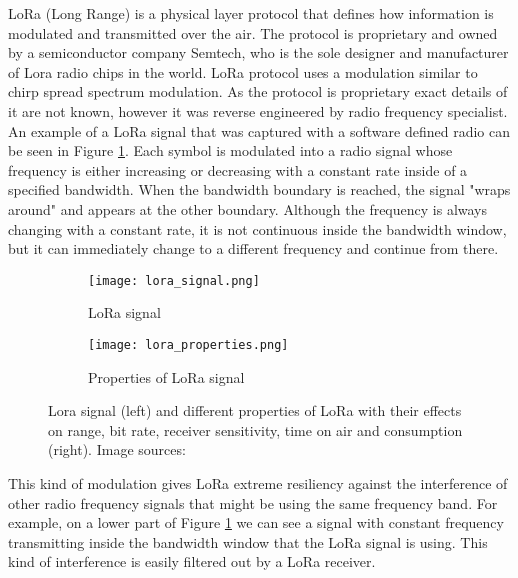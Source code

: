 LoRa (Long Range) is a physical layer protocol that defines how information is modulated and transmitted over the air\cite{lora_article}\cite{lora_nbiot}.
The protocol is proprietary and owned by a semiconductor company Semtech, who is the sole designer and manufacturer of Lora radio chips in the world.
LoRa protocol uses a modulation similar to chirp spread spectrum modulation\cite{lora_article}.
As the protocol is proprietary exact details of it are not known, however it was reverse engineered by radio frequency specialist\cite{lora_github}.
An example of a LoRa signal that was captured with a software defined radio can be seen in Figure \ref{lora1}.
Each symbol is modulated into a radio signal whose frequency is either increasing or decreasing with a constant rate inside of a specified bandwidth.
When the bandwidth boundary is reached, the signal "wraps around" and appears at the other boundary.
Although the frequency is always changing with a constant rate, it is not continuous inside the bandwidth window, but it can immediately change to a different frequency and continue from there.

\begin{figure}[ht]
    \begin{subfigure}{0.3\textwidth}
        \centering
        \texttt{[image: lora\_signal.png]} 
        \caption{ LoRa signal}
        \label{lora1}
    \end{subfigure}
    \hspace{0.5cm}%
    \begin{subfigure}{0.7\textwidth}
        \texttt{[image: lora\_properties.png]}
        \caption{ Properties of LoRa signal}
        \label{lora2}
    \end{subfigure}
\caption[Properties of Lora signal.] {Lora signal (left) and different properties of LoRa with their effects on range, bit rate, receiver sensitivity, time on air and consumption (right). Image sources:\cite{lora_github}\cite{lora_philly}}
    \label{lora}
\end{figure}

This kind of modulation gives LoRa extreme resiliency against the interference of other radio frequency signals that might be using the same frequency band\cite{lora_article}\cite{lora_philly}.
For example, on a lower part of Figure \ref{lora1} we can see a signal with constant frequency transmitting inside the bandwidth window that the LoRa signal is using.
This kind of interference is easily filtered out by a LoRa receiver.

